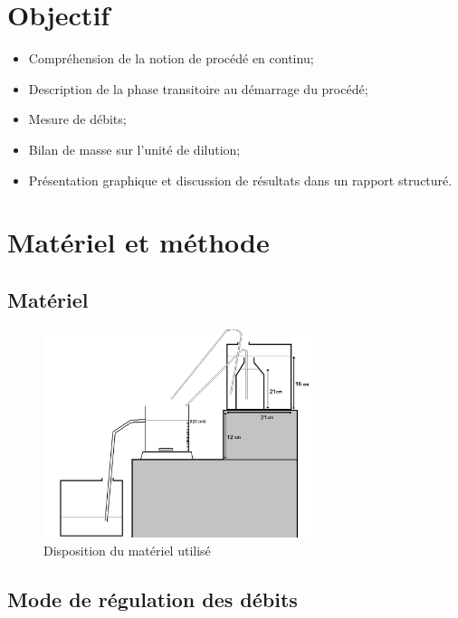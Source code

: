 \documentclass[a4paper,11pt]{article}
\begin{document}
\thispagestyle{empty}



\section{Objectif}
\begin{itemize}
	\item Compréhension de la notion de procédé en continu;
	\item Description de la phase transitoire au démarrage du procédé;
	\item Mesure de débits;
	\item Bilan de masse sur l'unité de dilution;
	\item Présentation graphique et discussion de résultats dans un rapport structuré.
\end{itemize}

\section{Matériel et méthode}
	\subsection{Matériel}
		\begin{figure}[h]
			\centering
			\includegraphics[width=0.7\textwidth]{pictures/materiel.png}
			\caption{Disposition du matériel utilisé}
		\end{figure}	
	\subsection{Mode de régulation des débits}
\end{document}
